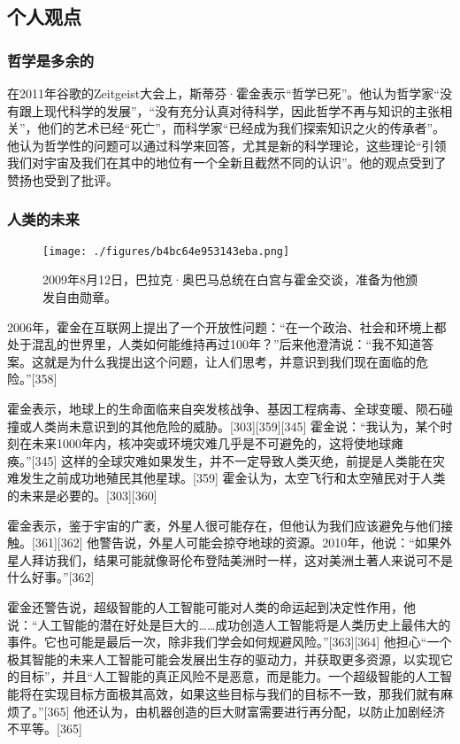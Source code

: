 \subsection{个人观点} 
\subsubsection{哲学是多余的}  
在2011年谷歌的Zeitgeist大会上，斯蒂芬·霍金表示“哲学已死”。他认为哲学家“没有跟上现代科学的发展”，“没有充分认真对待科学，因此哲学不再与知识的主张相关”，他们的艺术已经“死亡”，而科学家“已经成为我们探索知识之火的传承者”。他认为哲学性的问题可以通过科学来回答，尤其是新的科学理论，这些理论“引领我们对宇宙及我们在其中的地位有一个全新且截然不同的认识”。他的观点受到了赞扬也受到了批评。
\subsubsection{人类的未来}
\begin{figure}[ht]
\centering
\texttt{[image: ./figures/b4bc64e953143eba.png]}
\caption{2009年8月12日，巴拉克·奥巴马总统在白宫与霍金交谈，准备为他颁发自由勋章。} \label{fig_HJ_8}
\end{figure}
2006年，霍金在互联网上提出了一个开放性问题：“在一个政治、社会和环境上都处于混乱的世界里，人类如何能维持再过100年？”后来他澄清说：“我不知道答案。这就是为什么我提出这个问题，让人们思考，并意识到我们现在面临的危险。”[358]

霍金表示，地球上的生命面临来自突发核战争、基因工程病毒、全球变暖、陨石碰撞或人类尚未意识到的其他危险的威胁。[303][359][345] 霍金说：“我认为，某个时刻在未来1000年内，核冲突或环境灾难几乎是不可避免的，这将使地球瘫痪。”[345] 这样的全球灾难如果发生，并不一定导致人类灭绝，前提是人类能在灾难发生之前成功地殖民其他星球。[359] 霍金认为，太空飞行和太空殖民对于人类的未来是必要的。[303][360]

霍金表示，鉴于宇宙的广袤，外星人很可能存在，但他认为我们应该避免与他们接触。[361][362] 他警告说，外星人可能会掠夺地球的资源。2010年，他说：“如果外星人拜访我们，结果可能就像哥伦布登陆美洲时一样，这对美洲土著人来说可不是什么好事。”[362]

霍金还警告说，超级智能的人工智能可能对人类的命运起到决定性作用，他说：“人工智能的潜在好处是巨大的……成功创造人工智能将是人类历史上最伟大的事件。它也可能是最后一次，除非我们学会如何规避风险。”[363][364] 他担心“一个极其智能的未来人工智能可能会发展出生存的驱动力，并获取更多资源，以实现它的目标”，并且“人工智能的真正风险不是恶意，而是能力。一个超级智能的人工智能将在实现目标方面极其高效，如果这些目标与我们的目标不一致，那我们就有麻烦了。”[365] 他还认为，由机器创造的巨大财富需要进行再分配，以防止加剧经济不平等。[365]

